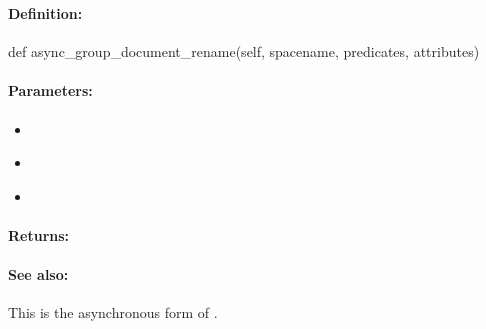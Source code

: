 \subsubsection{}
\label{api:python:async_group_document_rename}


\paragraph{Definition:}
\begin{pythoncode}
def async_group_document_rename(self, spacename, predicates, attributes)
\end{pythoncode}

\paragraph{Parameters:}
\begin{itemize}[noitemsep]
\item {}\\

\item {}\\

\item {}\\

\end{itemize}

\paragraph{Returns:}


\paragraph{See also:}  This is the asynchronous form of .

\pagebreak
\subsubsection{}
\label{api:python:document_unset}


